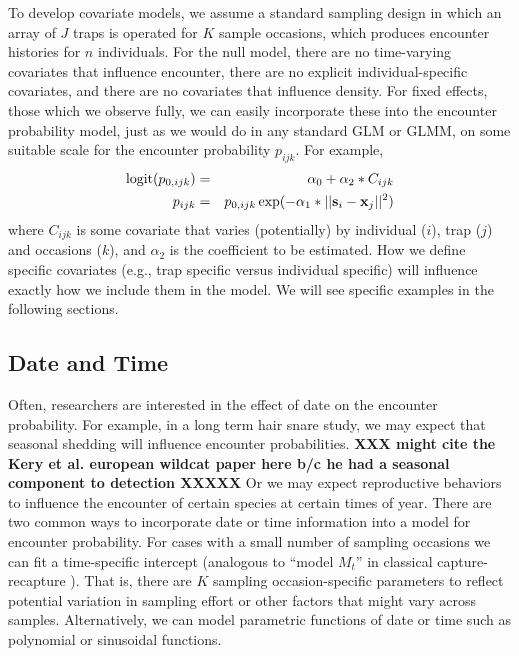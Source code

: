 To develop covariate models, we assume a standard sampling design in which an
array of $J$ traps is operated for $K$ sample occasions, which produces
encounter histories for $n$ individuals.  For the null model, there
are no time-varying covariates that influence encounter, there are no
explicit individual-specific covariates, and there are no covariates
that influence density.  For fixed effects, those which we observe
fully, we can easily incorporate these into the encounter probability
model, just as we would do in any standard GLM or GLMM, on some
suitable scale for the encounter probability $p_{ijk}$. For example,
\begin{eqnarray*}
\mbox{logit}(p_{0,ijk}) &=& \alpha_0 + \alpha_2*C_{ijk} \\
p_{ijk} &=& p_{0,ijk} \exp(- \alpha_1*||{\bf s}_{i}-{\bf x}_{j}||^2) 
\end{eqnarray*}
where $C_{ijk}$ is some covariate that varies (potentially) by
individual ($i$), trap ($j$) and occasions ($k$), and
$\alpha_2$ is the coefficient to be estimated.
 How we define specific covariates (e.g., trap specific
versus individual specific) will influence exactly how we include them
in the model. We will see specific examples in the following sections.  

\subsection{Date and Time}

Often, researchers are interested in the effect of date on the
encounter probability. For example, in a long term hair snare study,
we may expect that seasonal shedding will influence encounter
probabilities. {\bf XXX might cite the Kery et al. european wildcat
  paper here b/c he had a seasonal component to detection XXXXX} Or we
may expect reproductive behaviors to influence the encounter of
certain species at certain times of year.  There are two common ways
to incorporate date or time information into a model for encounter
probability. For cases with a small number of sampling occasions we
can fit a time-specific intercept (analogous to ``model $M_{t}$'' in
classical capture-recapture \citep{otis_etal:1978}). That is, there
are $K$ sampling occasion-specific parameters to reflect potential
variation in sampling effort or other factors that might vary across
samples.  Alternatively, we can model parametric functions of date or
time such as polynomial or sinusoidal functions.

